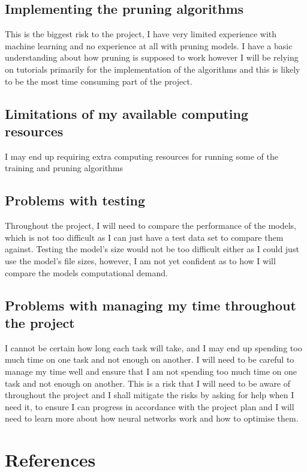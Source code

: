 \documentclass{article}
\begin{document}
\subsection{Implementing the pruning algorithms}
This is the biggest risk to the project, I have very limited experience with machine learning and no experience at all with pruning models. I have a basic understanding about how pruning is supposed to work however I will be relying on tutorials primarily for the implementation of the algorithms and this is likely to be the most time consuming part of the project.

\subsection{Limitations of my available computing resources}
I may end up requiring extra computing resources for running some of the training and pruning algorithms 

\subsection{Problems with testing}
Throughout the project, I will need to compare the performance of the models, which is not too difficult as I can just have a test data set to compare them against. Testing the model's size would not be too difficult either as I could just use the model's file sizes, however, I am not yet confident as to how I will compare the models computational demand.

\subsection{Problems with managing my time throughout the project}
I cannot be certain how long each task will take, and I may end up spending too much time on one task and not enough on another. I will need to be careful to manage my time well and ensure that I am not spending too much time on one task and not enough on another.
This is a risk that I will need to be aware of throughout the project and I shall mitigate the risks by asking for help when I need it, to ensure I can progress in accordance with the project plan and I will need to learn more about how neural networks work 
and how to optimise them.

\pagebreak
\section{References}

\lipsum[1]\lipsum[2]
\end{document}
